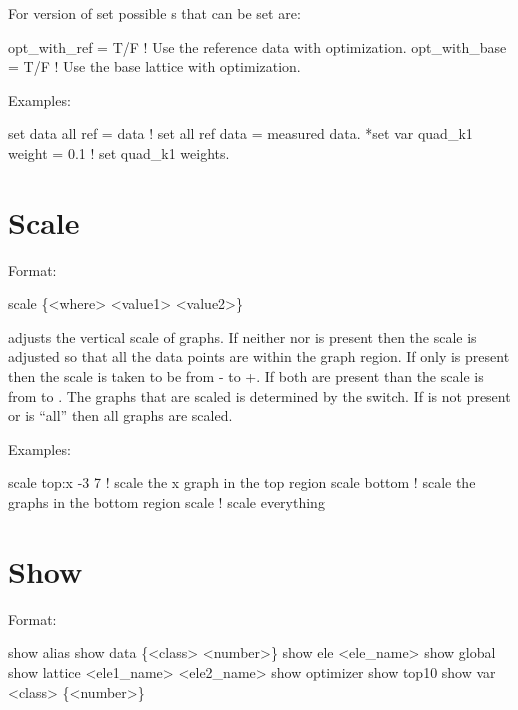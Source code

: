 For  version of set possible 
s that can be set are:
\begin{example}
  opt\_with\_ref  = T/F ! Use the reference data with optimization.
  opt\_with\_base = T/F ! Use the base lattice with optimization.
\end{example}

Examples:
\begin{example}
  set data all ref = data       ! set all ref data = measured data.
  *set var quad\_k1 weight = 0.1 ! set quad\_k1 weights. 
\end{example}

\section{Scale}
\label{s:scale}

Format:
\begin{example}
  scale \{<where> <value1> <value2>\}
\end{example}

\vskip 0.2in  adjusts the vertical scale of graphs. If
neither  nor  is present then the scale is
adjusted so that all the data points are within the graph region.  If
only  is present then the scale is taken to be from
- to +. If both are present than the scale
is from  to .  The graphs that are scaled
is determined by the  switch. If  is not
present  or  is ``all'' then all graphs are scaled. 

Examples:
\begin{example}
  scale top:x -3  7  ! scale the x graph in the top region
  scale bottom       ! scale the graphs in the bottom region
  scale              ! scale everything
\end{example}


\section{Show}
\label{s:show}

Format:
\begin{example}
  show alias                     
  show data \{<class> <number>\} 
  show ele <ele_name>
  show global
  show lattice <ele1_name> <ele2_name>
  show optimizer
  show top10
  show var <class> \{<number>\}
\end{example}

